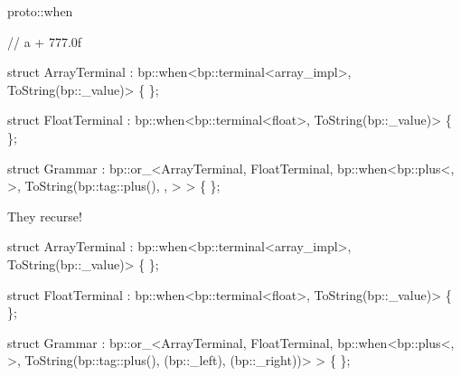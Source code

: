 \begin{frame}[fragile]{proto::when}
\begin{semiverbatim}
// \alert<1>{a + 777.0f}

struct \alert<3>{ArrayTerminal}
  : bp::when<\alert<2,8>{bp::terminal<\alert<9>{array_impl}>}, \alert<11>{ToString(bp::_value)}>
\{ \};

struct \alert<5>{FloatTerminal}
  : bp::when<\alert<4>{bp::terminal<float>}, ToString(bp::_value)>
\{ \};

struct Grammar : 
  bp::or_<ArrayTerminal,
          FloatTerminal,
          bp::when<\alert<6>{bp::plus<, 
                            >},
                   \alert<7>{ToString(\alert<14>{bp::tag::plus()},
                            ,
                            }>
	    >
\{ \};      
\end{semiverbatim}
\note{ }
\end{frame}


\begin{frame}[fragile]{They recurse!}
\begin{semiverbatim}
struct \alert<2>{ArrayTerminal}
  : bp::when<bp::terminal<array_impl>, ToString(bp::_value)>
\{ \};

struct \alert<2>{FloatTerminal}
  : bp::when<bp::terminal<float>, ToString(bp::_value)>
\{ \};

struct \alert<4>{Grammar} :
  bp::or_<\alert<3>{ArrayTerminal},
          \alert<3>{FloatTerminal},
          bp::when<bp::plus<,
                            >,
                   \alert<5>{ToString(bp::tag::plus(),
                            (bp::_left),
                            (bp::_right))}>
     >
\{ \};
\end{semiverbatim}
\end{frame}

